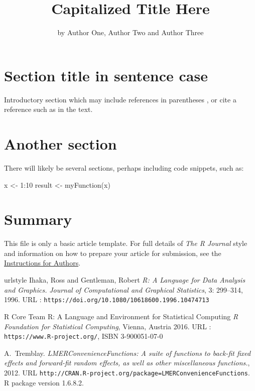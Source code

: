 \title{Capitalized Title Here}
\author{by Author One, Author Two and Author Three}

\maketitle


\section{Section title in sentence case}

Introductory section which may include references in parentheses
\citep{R}, or cite a reference such as \citet{R} in the text.


\section{Another section}

There will likely be several sections, perhaps including code snippets, such as:

\begin{example}
  x <- 1:10
  result <- myFunction(x)
\end{example}

\section{Summary}

This file is only a basic article template. For full details of \emph{The R Journal} style and information on how to prepare your article for submission, see the \href{https://journal.r-project.org/share/author-guide.pdf}{Instructions for Authors}.


\begin{thebibliography}{20}
    \providecommand{\natexlab}[1]{#1}
    \providecommand{\url}[1]{\texttt{#1}}
    \expandafter\ifx\csname urlstyle\endcsname\relax
      \providecommand{\doi}[1]{doi: #1}\else
      \providecommand{\doi}{doi: \begingroup \urlstyle{rm}\Url}\fi
{}
Ihaka, Ross and Gentleman, Robert
\newblock \emph{R: A Language for Data Analysis and Graphics.}
\newblock \emph{Journal of Computational and Graphical Statistics}, 3:
299--314, 1996.
\newblock URL : \url{https://doi.org/10.1080/10618600.1996.10474713}

R Core Team
\newblock R: A Language and Environment for Statistical Computing
\newblock \emph{R Foundation for Statistical Computing}, Vienna, Austria  2016.
\newblock URL : \url{https://www.R-project.org/}, ISBN 3-900051-07-0

A.~Tremblay.
\newblock \emph{LMERConvenienceFunctions: A suite of functions to back-fit
  fixed effects and forward-fit random effects, as well as other miscellaneous
  functions.}, 2012.
\newblock URL \url{http://CRAN.R-project.org/package=LMERConvenienceFunctions}.
\newblock R package version 1.6.8.2.
\end{thebibliography}


